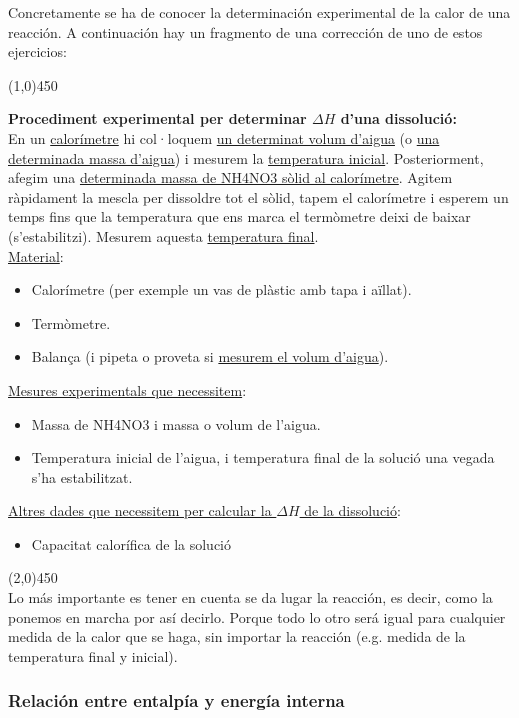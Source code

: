\documentclass[arial,a4paper,print]{article}
\begin{document}
Concretamente se ha de conocer la determinación experimental de la calor de una reacción. A 
continuación hay un fragmento de una corrección de uno de estos ejercicios:

\line(1,0){450}

\textbf{Procediment experimental per determinar $\Delta H$ d'una dissolució:}
\\

En un \underline{calorímetre} hi col·loquem \underline{un determinat volum d’aigua} (o \underline{una determinada
massa d’aigua}) i mesurem la \underline{temperatura inicial}. Posteriorment, afegim una
\underline{determinada massa de NH4NO3 sòlid al calorímetre}. Agitem ràpidament la mescla per
dissoldre tot el sòlid, tapem el calorímetre i esperem un temps fins que la temperatura
que ens marca el termòmetre deixi de baixar (s’estabilitzi). Mesurem aquesta
\underline{temperatura final}.
\\

\underline{Material}:
\begin{itemize}
\item Calorímetre (per exemple un vas de plàstic amb tapa i aïllat).
\item Termòmetre.
\item Balança (i pipeta o proveta si \underline{mesurem el volum d’aigua}).

\end{itemize}


\underline{Mesures experimentals que necessitem}:
\begin{itemize}
\item Massa de NH4NO3 i massa o volum de l’aigua.
\item Temperatura inicial de l’aigua, i temperatura final de la solució una vegada s’ha
estabilitzat.
\end{itemize}


\underline{Altres dades que necessitem per calcular la $\Delta H$ de la dissolució}:
\begin{itemize}
\item Capacitat calorífica de la solució 
\end{itemize}

\line(2,0){450}
\\
Lo más importante es tener en cuenta se da lugar la reacción, es decir, como la ponemos en marcha por así decirlo. Porque todo lo otro será igual para cualquier medida de la calor que se haga, sin importar la reacción (e.g. medida de la temperatura final y inicial). 
\pagebreak
\subsubsection{Relación entre entalpía y energía interna}
\end{document}

